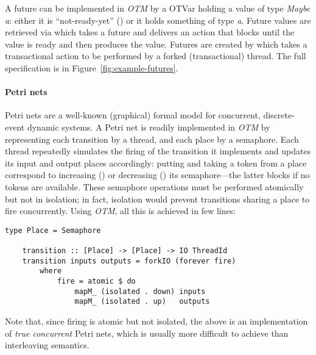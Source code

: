 A future can be implemented in \emph{OTM} by a OTVar
holding a value of type \emph{Maybe a}: either it is
``not-ready-yet'' () or it holds something 
of type \emph{a}.
Future values are retrieved via  which takes 
a future and delivers an action that blocks until the value is
ready and then produces the value.
Futures are created by  which takes a transactional
action to be performed by a forked (transactional) thread. 
The full specification is in Figure~\ref{fig:example-futures}.

\paragraph{Petri nets}
Petri nets are a well-known (graphical) formal model for concurrent, discrete-event dynamic systems.
A Petri net is readily implemented in \emph{OTM} 
by representing each transition by a thread, and each place by a semaphore.
Each thread repeatedly simulates the firing of the transition it 
implements and updates its input and output places accordingly:
putting and taking a token from a place correspond to 
increasing () or decreasing ()
its semaphore---the latter blocks if no tokens are available.
These semaphore operations must be 
performed atomically but not in isolation; in fact, 
isolation would prevent transitions sharing a place to
fire concurrently. 
Using \emph{OTM}, all this is achieved in few lines:
\begin{Verbatim}[tabsize=3, xleftmargin=1ex, gobble=1]
    type Place = Semaphore
    
    transition :: [Place] -> [Place] -> IO ThreadId
    transition inputs outputs = forkIO (forever fire)
        where 
            fire = atomic $ do
                mapM_ (isolated . down) inputs
                mapM_ (isolated . up)   outputs
\end{Verbatim}
Note that, since firing is atomic but not isolated,
the above is an implementation of \emph{true concurrent} Petri nets, which is usually more difficult to achieve than interleaving semantics.

